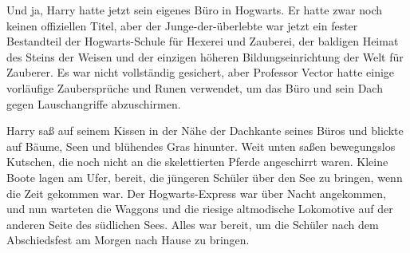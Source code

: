 Und ja, Harry hatte jetzt sein eigenes Büro in Hogwarts. Er hatte zwar noch keinen offiziellen Titel, aber der Junge-der-überlebte war jetzt ein fester Bestandteil der Hogwarts-Schule für Hexerei und Zauberei, der baldigen Heimat des Steins der Weisen und der einzigen höheren Bildungseinrichtung der Welt für Zauberer. Es war nicht vollständig gesichert, aber Professor Vector hatte einige vorläufige Zaubersprüche und Runen verwendet, um das Büro und sein Dach gegen Lauschangriffe abzuschirmen.

Harry saß auf seinem Kissen in der Nähe der Dachkante seines Büros und blickte auf Bäume, Seen und blühendes Gras hinunter. Weit unten saßen bewegungslos Kutschen, die noch nicht an die skelettierten Pferde angeschirrt waren. Kleine Boote lagen am Ufer, bereit, die jüngeren Schüler über den See zu bringen, wenn die Zeit gekommen war. Der Hogwarts-Express war über Nacht angekommen, und nun warteten die Waggons und die riesige altmodische Lokomotive auf der anderen Seite des südlichen Sees. Alles war bereit, um die Schüler nach dem Abschiedsfest am Morgen nach Hause zu bringen.

